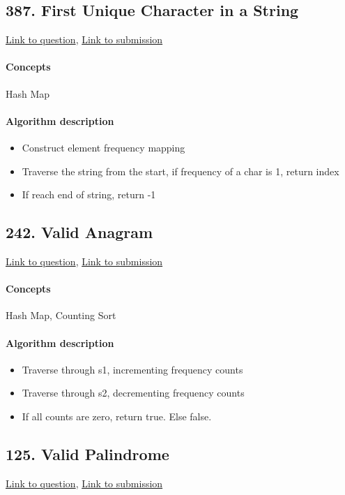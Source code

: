 \documentclass[11pt]{book}
\begin{document}
\subsection{387. First Unique Character in a String}
\href{https://leetcode.com/problems/first-unique-character-in-a-string/}{Link to question},
\href{https://leetcode.com/submissions/detail/333317093/}{Link to submission}
\paragraph{Concepts}
Hash Map
\paragraph{Algorithm description}
\begin{itemize}
    \item Construct element frequency mapping
    \item Traverse the string from the start, if frequency of a char is 1, return index
    \item If reach end of string, return -1
\end{itemize}

\subsection{242. Valid Anagram}
\href{https://leetcode.com/problems/valid-anagram/}{Link to question},
\href{https://leetcode.com/submissions/detail/333323752/}{Link to submission}
\paragraph{Concepts}
Hash Map, Counting Sort
\paragraph{Algorithm description}
\begin{itemize}
    \item Traverse through s1, incrementing frequency counts
    \item Traverse through s2, decrementing frequency counts
    \item If all counts are zero, return true. Else false.
\end{itemize}

\subsection{125. Valid Palindrome}
\href{https://leetcode.com/problems/valid-palindrome/}{Link to question},
\href{https://leetcode.com/submissions/detail/333333971/}{Link to submission}
\end{document}
